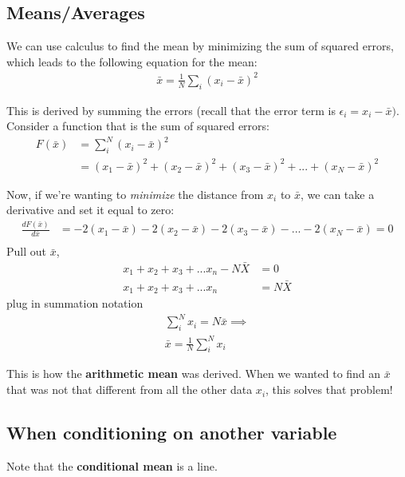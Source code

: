 \documentclass{article}
\begin{document}
\subsection{Means/Averages}

We can use calculus to find the mean by minimizing the sum of squared errors, which leads to the following equation for the mean: 
\begin{align}
    \bar x = \frac{1}{N} \sum_i (x_i - \bar x)^2 
\end{align}

This is derived by summing the errors (recall that the error term is $\epsilon_i = x_i - \bar x)$. \\

Consider a function that is the sum of squared errors:
\begin{align}
    F(\bar x) &= \sum_i^N (x_i - \bar x)^2\\
    &= (x_1 - \bar x)^2 + (x_2 - \bar x)^2  + (x_3 - \bar x)^2 +... + (x_N - \bar x)^2
\end{align}

Now, if we're wanting to \textit{minimize} the distance from $x_i$ to $\bar x$, we can take a derivative and set it equal to zero: 
\begin{align}
    \frac{d F(\bar x)}{d\bar x} &= -2(x_1 - \bar x)  -2(x_2 - \bar x) -2(x_3 - \bar x) - ... -2(x_N - \bar x) = 0\\
\end{align}
Pull out $\bar x$, 
\begin{align}
    x_1 + x_2 + x_3 + ... x_n - N \bar X &= 0\\
    x_1 + x_2 + x_3 + ... x_n &= N \bar X
\end{align}
plug in summation notation 
\begin{align}
    \sum_i^N x_i = N \bar x \implies \\
    \bar x = \frac{1}{N}\sum_i^N x_i
\end{align}

This is how the \textbf{arithmetic mean} was derived. When we wanted to find an $\bar x$ that was not that different from all the other data $x_i$, this solves that problem! 



\subsection{When conditioning on another variable}
Note that the \textbf{conditional mean} is a line.\\
\end{document}

